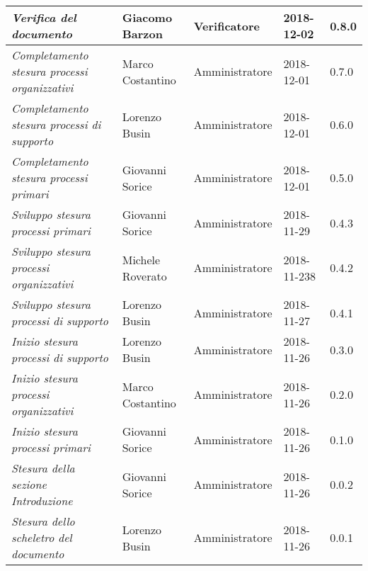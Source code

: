 \begin{longtable}{p{4cm}|C{3cm}|C{3cm}|R{2.5cm}|R{2cm}}
		\emph{Verifica del documento} & Giacomo Barzon & Verificatore & 2018-12-02 & 0.8.0 \\
		\hline
		
		\emph{Completamento stesura processi organizzativi} & Marco Costantino & Amministratore & 2018-12-01 & 0.7.0 \\
		\hline
		
		\emph{Completamento stesura processi di supporto} & Lorenzo Busin & Amministratore & 2018-12-01 & 0.6.0 \\
		\hline
		
		\emph{Completamento stesura processi primari} & Giovanni Sorice & Amministratore & 2018-12-01 & 0.5.0 \\
		\hline
		
		\emph{Sviluppo stesura processi primari} & Giovanni Sorice & Amministratore & 2018-11-29 & 0.4.3 \\
		\hline
		
		\emph{Sviluppo stesura processi organizzativi} & Michele Roverato & Amministratore & 2018-11-238 & 0.4.2 \\
		\hline
		
		\emph{Sviluppo stesura processi di supporto} & Lorenzo Busin & Amministratore & 2018-11-27 & 0.4.1 \\
		\hline
		
		\emph{Inizio stesura processi di supporto} & Lorenzo Busin & Amministratore & 2018-11-26 & 0.3.0 \\
		\hline
		
		\emph{Inizio stesura processi organizzativi} & Marco Costantino & Amministratore & 2018-11-26 & 0.2.0 \\
		\hline
		
		\emph{Inizio stesura processi primari} & Giovanni Sorice & Amministratore & 2018-11-26 & 0.1.0 \\
		\hline
		
		\emph{Stesura della sezione Introduzione} & Giovanni Sorice & Amministratore & 2018-11-26 & 0.0.2 \\
		\hline
		
		\emph{Stesura dello scheletro del documento} & Lorenzo Busin & Amministratore & 2018-11-26 & 0.0.1 \\
	
	
\end{longtable}


\clearpage